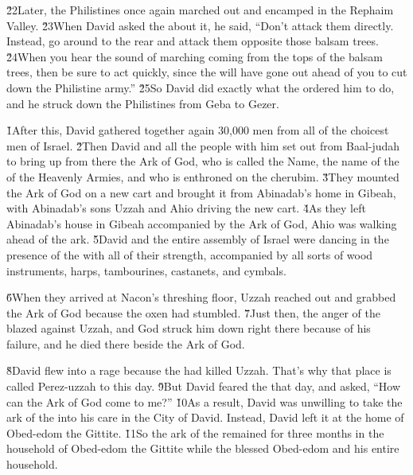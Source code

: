 \v{22}Later, the Philistines once again marched out and encamped in the Rephaim Valley. \v{23}When David asked the  about it, he said, ``Don't attack them directly. Instead, go around to the rear and attack them opposite those balsam trees. \v{24}When you hear the sound of marching coming from the tops of the balsam trees, then be sure to act quickly, since the  will have gone out ahead of you to cut down the Philistine army.'' \v{25}So David did exactly what the  ordered him to do, and he struck down the Philistines from Geba to Gezer.

\v{1}After this, David gathered together again 30,000 men from all of the choicest men of Israel. \v{2}Then David and all the people with him set out from Baal-judah to bring up from there the Ark of God, who is called the Name, the name of the  of the Heavenly Armies, and who is enthroned on the cherubim. \v{3}They mounted the Ark of God on a new cart and brought it from Abinadab's home in Gibeah, with Abinadab's sons Uzzah and Ahio driving the new cart. \v{4}As they left Abinadab's house in Gibeah accompanied by the Ark of God, Ahio was walking ahead of the ark. \v{5}David and the entire assembly of Israel were dancing in the presence of the  with all of their strength, accompanied by all sorts of wood instruments, harps, tambourines, castanets, and cymbals.

\v{6}When they arrived at Nacon's threshing floor, Uzzah reached out and grabbed the Ark of God because the oxen had stumbled. \v{7}Just then, the anger of the  blazed against Uzzah, and God struck him down right there because of his failure, and he died there beside the Ark of God.

\v{8}David flew into a rage because the  had killed Uzzah. That's why that place is called Perez-uzzah to this day. \v{9}But David feared the  that day, and asked, ``How can the Ark of God come to me?'' \v{10}As a result, David was unwilling to take the ark of the  into his care in the City of David. Instead, David left it at the home of Obed-edom the Gittite. \v{11}So the ark of the  remained for three months in the household of Obed-edom the Gittite while the  blessed Obed-edom and his entire household.

